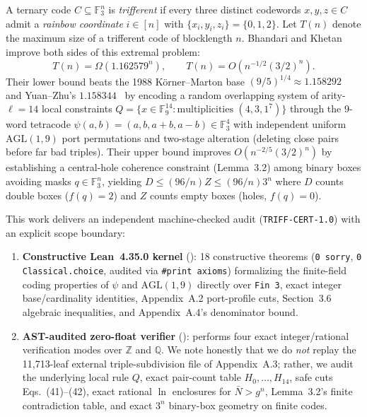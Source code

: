 \documentclass[10pt,twocolumn]{article}
\begin{document}
A ternary code $C \subseteq \mathbb{F}_3^n$ is \emph{trifferent} if every three distinct codewords $x, y, z \in C$ admit a \emph{rainbow coordinate} $i \in [n]$ with $\{x_i, y_i, z_i\} = \{0, 1, 2\}$. Let $T(n)$ denote the maximum size of a trifferent code of blocklength $n$. Bhandari and Khetan~\cite{bhandari2026triff} improve both sides of this extremal problem:
\begin{equation}
  T(n) = \Omega(1.162579^n), \qquad T(n) = O\!\left(n^{-1/2}(3/2)^n\right).
\end{equation}
Their lower bound beats the 1988 K\"{o}rner--Marton base $(9/5)^{1/4} \approx 1.158292$~\cite{korner1988} and Yuan--Zhu's $1.158344$~\cite{yuan2026} by encoding a random overlapping system of arity-$\ell=14$ local constraints $Q = \{x \in \mathbb{F}_9^{14} : \text{multiplicities } (4,3,1^7)\}$ through the 9-word tetracode $\psi(a,b) = (a, b, a+b, a-b) \in \mathbb{F}_3^4$ with independent uniform $\mathrm{AGL}(1,9)$ port permutations and two-stage alteration (deleting close pairs before far bad triples). Their upper bound improves $O(n^{-2/5}(3/2)^n)$ by establishing a central-hole coherence constraint (Lemma~3.2) among binary boxes avoiding masks $q \in \mathbb{F}_3^n$, yielding $D \le (96/n) Z \le (96/n) 3^n$ where $D$ counts double boxes ($f(q)=2$) and $Z$ counts empty boxes (holes, $f(q)=0$).

This work delivers an independent machine-checked audit (\texttt{TRIFF-CERT-1.0}) with an explicit scope boundary:
\begin{enumerate}
  \item \textbf{Constructive Lean~4.35.0 kernel} (): 18 constructive theorems (\texttt{0 sorry}, \texttt{0 Classical.choice}, audited via \texttt{\#print axioms}) formalizing the finite-field coding properties of $\psi$ and $\mathrm{AGL}(1,9)$ directly over \texttt{Fin 3}, exact integer base/cardinality identities, Appendix~A.2 port-profile cuts, Section~3.6 algebraic inequalities, and Appendix~A.4's denominator bound.
  \item \textbf{AST-audited zero-float verifier} (): performs four exact integer/rational verification modes over $\mathbb{Z}$ and $\mathbb{Q}$. We note honestly that we do \emph{not} replay the 11,713-leaf external triple-subdivision file of Appendix~A.3; rather, we audit the underlying local rule $Q$, exact pair-count table $H_0,\dots,H_{14}$, safe cuts Eqs.~(41)--(42), exact rational $\ln$ enclosures for $\bar{N} > g^n$, Lemma~3.2's finite contradiction table, and exact $3^n$ binary-box geometry on finite codes.
\end{enumerate}
\end{document}
